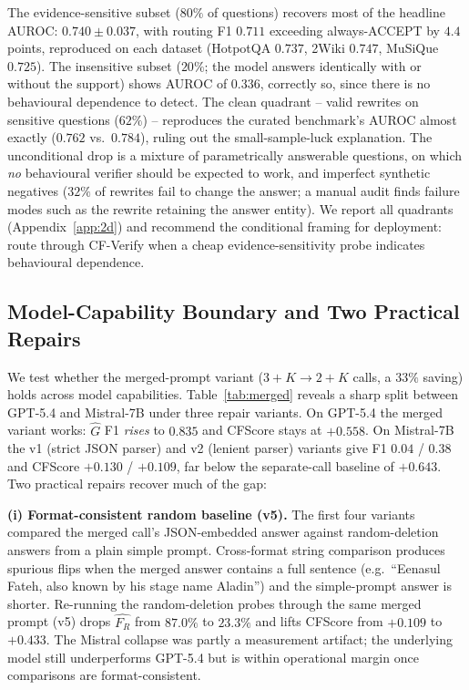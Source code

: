 \documentclass[11pt]{article}
\begin{document}
The evidence-sensitive subset ($80\%$ of questions) recovers most of the headline AUROC: $0.740 \pm 0.037$, with routing F1 $0.711$ exceeding always-ACCEPT by $4.4$ points, reproduced on each dataset (HotpotQA $0.737$, 2Wiki $0.747$, MuSiQue $0.725$). The insensitive subset ($20\%$; the model answers identically with or without the support) shows AUROC of $0.336$, correctly so, since there is no behavioural dependence to detect. The clean quadrant -- valid rewrites on sensitive questions ($62\%$) -- reproduces the curated benchmark's AUROC almost exactly ($0.762$ vs.\ $0.784$), ruling out the small-sample-luck explanation. The unconditional drop is a mixture of parametrically answerable questions, on which \emph{no} behavioural verifier should be expected to work, and imperfect synthetic negatives ($32\%$ of rewrites fail to change the answer; a manual audit finds failure modes such as the rewrite retaining the answer entity). We report all quadrants (Appendix~\ref{app:2d}) and recommend the conditional framing for deployment: route through CF-Verify when a cheap evidence-sensitivity probe indicates behavioural dependence.

\subsection{Model-Capability Boundary and Two Practical Repairs}
\label{sec:merged}
We test whether the merged-prompt variant ($3{+}K \to 2{+}K$ calls, a $33\%$ saving) holds across model capabilities. Table~\ref{tab:merged} reveals a sharp split between GPT-5.4 and Mistral-7B under three repair variants. On GPT-5.4 the merged variant works: $\hat{G}$ F1 \emph{rises} to $0.835$ and CFScore stays at $+0.558$. On Mistral-7B the v1 (strict JSON parser) and v2 (lenient parser) variants give F1 $0.04$ / $0.38$ and CFScore $+0.130$ / $+0.109$, far below the separate-call baseline of $+0.643$. Two practical repairs recover much of the gap:

\textbf{(i) Format-consistent random baseline (v5).} The first four variants compared the merged call's JSON-embedded answer against random-deletion answers from a plain simple prompt. Cross-format string comparison produces spurious flips when the merged answer contains a full sentence (e.g.\ ``Eenasul Fateh, also known by his stage name Aladin'') and the simple-prompt answer is shorter. Re-running the random-deletion probes through the same merged prompt (v5) drops $\widehat{F_R}$ from $87.0\%$ to $23.3\%$ and lifts CFScore from $+0.109$ to $+0.433$. The Mistral collapse was partly a measurement artifact; the underlying model still underperforms GPT-5.4 but is within operational margin once comparisons are format-consistent.
\end{document}
